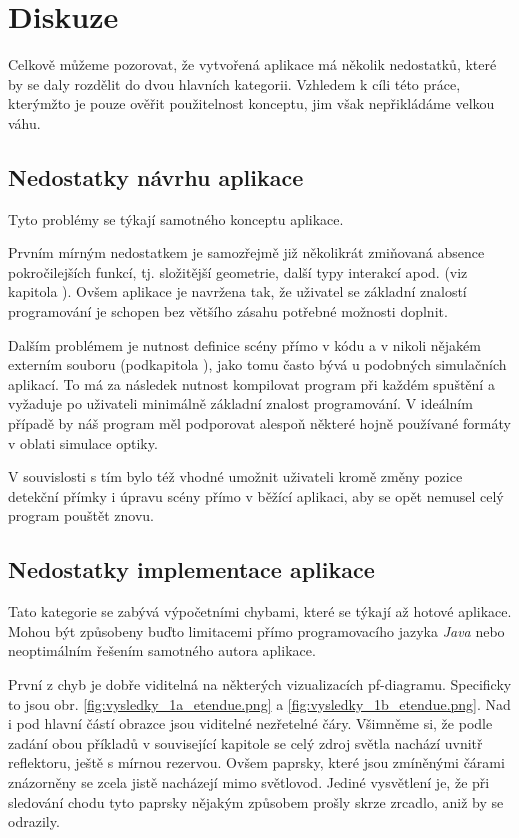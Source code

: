 \chapter{Diskuze}

Celkově můžeme pozorovat, že vytvořená aplikace má několik nedostatků, které by se daly rozdělit do dvou hlavních kategorii. Vzhledem k cíli této práce, kterýmžto je pouze ověřit použitelnost konceptu, jim však nepřikládáme velkou váhu.

\section{Nedostatky návrhu aplikace}

Tyto problémy se týkají samotného konceptu aplikace.

Prvním mírným nedostatkem je samozřejmě již několikrát zmiňovaná absence pokročilejších funkcí, tj. složitější geometrie, další typy interakcí apod. (viz kapitola ). Ovšem aplikace je navržena tak, že uživatel se základní znalostí programování je schopen bez většího zásahu potřebné možnosti doplnit.

Dalším problémem je nutnost definice scény přímo v kódu a v nikoli nějakém externím souboru (podkapitola ), jako tomu často bývá u podobných simulačních aplikací. To má za následek nutnost kompilovat program při každém spuštění a vyžaduje po uživateli minimálně základní znalost programování. V ideálním případě by náš program měl podporovat alespoň některé hojně používané formáty v oblati simulace optiky.\src

V souvislosti s tím bylo též vhodné umožnit uživateli kromě změny pozice detekční přímky i úpravu scény přímo v běžící aplikaci, aby se opět nemusel celý program pouštět znovu.

\section{Nedostatky implementace aplikace}

Tato kategorie se zabývá výpočetními chybami, které se týkají až hotové aplikace. Mohou být způsobeny buďto limitacemi přímo programovacího jazyka \emph{Java} nebo neoptimálním řešením samotného autora aplikace.

První z chyb je dobře viditelná na některých vizualizacích pf-diagramu. Specificky to jsou obr. \ref{fig:vysledky_1a_etendue.png} a \ref{fig:vysledky_1b_etendue.png}. Nad i pod hlavní částí obrazce jsou viditelné nezřetelné čáry. Všimněme si, že podle zadání obou příkladů v související kapitole  se celý zdroj světla nachází uvnitř reflektoru, ještě s mírnou rezervou. Ovšem paprsky, které jsou zmíněnými čárami znázorněny se zcela jistě nacházejí mimo světlovod. Jediné vysvětlení je, že při sledování chodu tyto paprsky nějakým způsobem prošly skrze zrcadlo, aniž by se odrazily.


